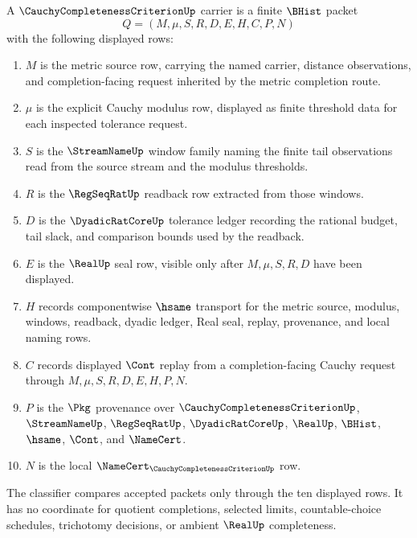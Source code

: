 \begin{definition}
\label{def:cauchy-completeness-criterion-carrier}
A $\CauchyCompletenessCriterionUp$ carrier is a finite $\BHist$ packet
$$
Q=(M,\mu,S,R,D,E,H,C,P,N)
$$
with the following displayed rows:
\begin{enumerate}
\item $M$ is the metric source row, carrying the named carrier, distance observations, and completion-facing request inherited by the metric completion route.
\item $\mu$ is the explicit Cauchy modulus row, displayed as finite threshold data for each inspected tolerance request.
\item $S$ is the $\StreamNameUp$ window family naming the finite tail observations read from the source stream and the modulus thresholds.
\item $R$ is the $\RegSeqRatUp$ readback row extracted from those windows.
\item $D$ is the $\DyadicRatCoreUp$ tolerance ledger recording the rational budget, tail slack, and comparison bounds used by the readback.
\item $E$ is the $\RealUp$ seal row, visible only after $M,\mu,S,R,D$ have been displayed.
\item $H$ records componentwise $\hsame$ transport for the metric source, modulus, windows, readback, dyadic ledger, Real seal, replay, provenance, and local naming rows.
\item $C$ records displayed $\Cont$ replay from a completion-facing Cauchy request through $M,\mu,S,R,D,E,H,P,N$.
\item $P$ is the $\Pkg$ provenance over $\CauchyCompletenessCriterionUp$, $\StreamNameUp$, $\RegSeqRatUp$, $\DyadicRatCoreUp$, $\RealUp$, $\BHist$, $\hsame$, $\Cont$, and $\NameCert$.
\item $N$ is the local $\NameCert_{\CauchyCompletenessCriterionUp}$ row.
\end{enumerate}
The classifier compares accepted packets only through the ten displayed rows. It has no coordinate for quotient completions, selected limits, countable-choice schedules, trichotomy decisions, or ambient $\RealUp$ completeness.
\end{definition}

